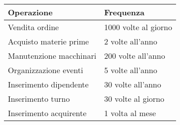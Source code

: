 \begin{center}
	\begin{tabular}{P{9.5cm}P{6cm}}
		\toprule
		 Operazione & Frequenza \\
		\midrule
		Vendita ordine & 1000 volte al giorno\\
		\midrule
		Acquisto materie prime & 2 volte all'anno\\
		\midrule
		Manutenzione macchinari & 200 volte all'anno\\
		\midrule
		Organizzazione eventi & 5 volte all'anno\\
		\midrule
		Inserimento dipendente & 30 volte all'anno\\
		\midrule
		Inserimento turno & 30 volte al giorno\\
		\midrule
		Inserimento acquirente & 1 volta al mese\\
		\bottomrule
	\end{tabular}
\end{center}